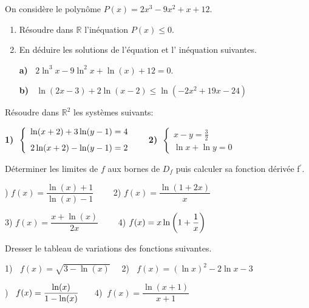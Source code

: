 \begin{exercice}
On considère le polynôme $ P(x)=2x^{3}-9x^{2}+x+12$.
\begin{enumerate}
\item Résoudre dans $ \mathbb{R} $   l'inéquation $ P(x)\leq0 $.
\item En déduire les  solutions  de l'équation et l' inéquation suivantes.

\medskip

\textbf{a)}\;  $\;\; 2\ln^{3}x-9\ln^{2} x+\ln(x)+12=0 $.

\medskip
\textbf{b)}\; $\;\; \ln(2x-3) +2\ln(x-2) \leq\ln(-2x^{2}+19x-24)$


\end{enumerate}
\end{exercice}
\begin{exercice}
 Résoudre dans $ \mathbb{R}^{2} $  les systèmes suivants:
\medskip

\textbf{1)} $\; \left\{\begin{array}{l}  \ln(x+2)+3 \ln(y-1)=4 \\[0.25cm]  2\ln(x+2)-\ln(y-1) =2 \end{array}\right. \hspace*{0.5cm}$
\textbf{2)} $\;  \left\{\begin{array}{l} x-y=\frac{3}{2} \\[0.25cm]  \ln x+\ln y=0 \end{array}\right.$

\end{exercice}

\begin{exercice}
Déterminer les limites  de $ f $ aux bornes de $ D_f $ puis  calculer sa fonction dérivée f$^{\prime} $.

)  $ f(x)=\dfrac{\ln(x)+1}{\ln(x)-1}\qquad $     2) $ f(x)= \dfrac{\ln(1+2x)}{x} $ 
\medskip

   3) $ f(x)=\dfrac{x+\ln(x)}{2x} \qquad$  4)  $ f(x)= x \ln\left(1+\dfrac{1}{x}\right)  $ 
\end{exercice}
\begin{exercice}
Dresser le tableau de variations  des fonctions suivantes.\medskip

1) $\;\; f(x)=\sqrt{3-\ln(x)} \quad$  2) $\;\; f(x)= (\ln x)^{2}-2\ln x-3 $


) $\;\; f(x)= \dfrac{\ln(x)}{1-\ln(x)}\hspace*{0.5cm}$   4)$\;\; f(x)= \dfrac{\ln(x+1)}{x+1} $

\end{exercice}


